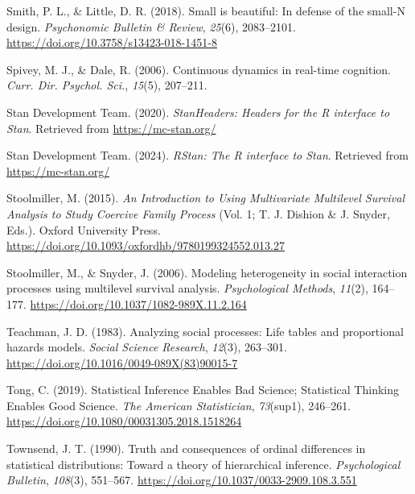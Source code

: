 \documentclass[
  english,
  man, donotrepeattitle,floatsintext]{apa6}
\newlength{\cslhangindent}
\newenvironment{CSLReferences}[2] %
 {\begin{list}{}{%
  \setlength{\itemindent}{0pt}
  \setlength{\leftmargin}{0pt}
  \setlength{\parsep}{0pt}
  \ifodd #1
   \setlength{\leftmargin}{\cslhangindent}
   \setlength{\itemindent}{-1\cslhangindent}
  \fi
  \setlength{\itemsep}{#2\baselineskip}}}
 {\end{list}}
\begin{document}
\begin{CSLReferences}{1}{0}
Smith, P. L., \& Little, D. R. (2018). Small is beautiful: {In} defense of the small-{N} design. \emph{Psychonomic Bulletin \& Review}, \emph{25}(6), 2083--2101. \url{https://doi.org/10.3758/s13423-018-1451-8}

Spivey, M. J., \& Dale, R. (2006). Continuous dynamics in real-time cognition. \emph{Curr. Dir. Psychol. Sci.}, \emph{15}(5), 207--211.

Stan Development Team. (2020). \emph{{StanHeaders}: Headers for the {R} interface to {Stan}}. Retrieved from \url{https://mc-stan.org/}

Stan Development Team. (2024). \emph{{RStan}: The {R} interface to {Stan}}. Retrieved from \url{https://mc-stan.org/}

Stoolmiller, M. (2015). \emph{An {Introduction} to {Using Multivariate Multilevel Survival Analysis} to {Study Coercive Family Process}} (Vol. 1; T. J. Dishion \& J. Snyder, Eds.). Oxford University Press. \url{https://doi.org/10.1093/oxfordhb/9780199324552.013.27}

Stoolmiller, M., \& Snyder, J. (2006). Modeling heterogeneity in social interaction processes using multilevel survival analysis. \emph{Psychological Methods}, \emph{11}(2), 164--177. \url{https://doi.org/10.1037/1082-989X.11.2.164}

Teachman, J. D. (1983). Analyzing social processes: {Life} tables and proportional hazards models. \emph{Social Science Research}, \emph{12}(3), 263--301. \url{https://doi.org/10.1016/0049-089X(83)90015-7}

Tong, C. (2019). Statistical {Inference Enables Bad Science}; {Statistical Thinking Enables Good Science}. \emph{The American Statistician}, \emph{73}(sup1), 246--261. \url{https://doi.org/10.1080/00031305.2018.1518264}

Townsend, J. T. (1990). Truth and consequences of ordinal differences in statistical distributions: {Toward} a theory of hierarchical inference. \emph{Psychological Bulletin}, \emph{108}(3), 551--567. \url{https://doi.org/10.1037/0033-2909.108.3.551}


\end{CSLReferences}
\end{document}
